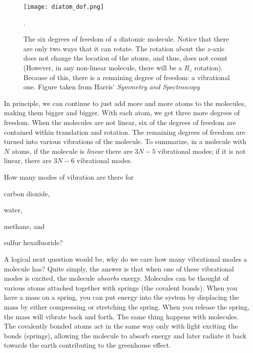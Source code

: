     \begin{figure}[ht]
         \centering
         \texttt{[image: diatom\_dof.png]}
         \caption{The six degrees of freedom of a diatomic molecule. Notice that there are only two ways that it can rotate. The rotation about the $z$-axis does not change the location of the atoms, and thus, does not count (However, in any non-linear molecule, there will be a $R_z$ rotation). Because of this, there is a remaining degree of freedom: a vibrational one. Figure taken from Harris' \emph{Symmetry and Spectroscopy} \citep{harris1978symmetry}}.
         \label{fig:diatom_dof}
     \end{figure} 

    In principle, we can continue to just add more and more atoms to the molecules, making them bigger and bigger. With each atom, we get three more degrees of freedom. When the molecules are not linear, six of the degrees of freedom are contained within translation and rotation. The remaining degrees of freedom are turned into various vibrations of the molecule. To summarize, in a molecule with $N$ atoms, if the molecule is \emph{linear} there are $3N -5$ vibrational modes; if it is not linear, there are $3N-6$ vibrational modes.

    \begin{exercise}
        How many modes of vibration are there for 
        \begin{enumerate*}[(a)]
            \item carbon dioxide,
            \item water,
            \item methane, and
            \item sulfur hexafluoride?
        \end{enumerate*}   
        \label{ex:vib_numbers}
    \end{exercise}

    A logical next question would be, why do we care how many vibrational modes a molecule has? Quite simply, the answer is that when one of these vibrational modes is excited, the molecule \emph{absorbs} energy. Molecules can be thought of various atoms attached together with springs (the covalent bonds). When you have a mass on a spring, you can put energy into the system by displacing the mass by either compressing or stretching the spring. When you release the spring, the mass will vibrate back and forth. The same thing happens with molecules. The covalently bonded atoms act in the same way only with light exciting the bonds (springs), allowing the molecule to absorb energy and later radiate it back towards the earth contributing to the greenhouse effect.

